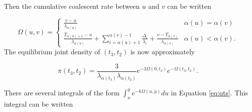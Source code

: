 \documentclass{article}
\begin{document}
Then the cumulative coalescent rate between $u$ and $v$ can be written

\begin{equation}
    \Omega(u,v) =
    \begin{cases}
        \frac{v-u}{\lambda_{\alpha(u)}} & \alpha(u) = \alpha(v)\\[1em]
        \frac{T_{\alpha(u)+1}-u}{\lambda_{\alpha(u)}} +
          \sum_{i=\alpha(u)+1}^{\alpha(v)-1}\frac{\Delta_i}{\lambda_i} +
          \frac{v-T_{\alpha(v)}}{\lambda_{\alpha(v)}}
          & \alpha(u) < \alpha(v).
    \end{cases}
\end{equation}
The equilibrium joint density of $(t_3,t_2)$ is now approximately

\begin{equation}
    \pi(t_3,t_2) = \frac{3}{\lambda_{\alpha(t_3)}\lambda_{\alpha(t_2)}}e^{-3\Omega(0,t_3)}e^{-\Omega(t_3,t_2)}.
    \label{eq:marginal}
\end{equation}

There are several integrals of the form $\int_x^y e^{-k\Omega(u,y)}du$ in
Equation \eqref{eq:qts}. This integral can be written
\end{document}
